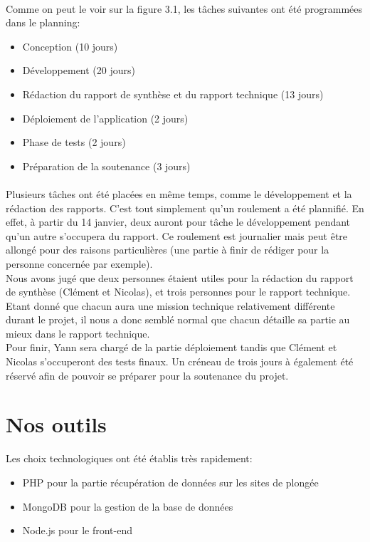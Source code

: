 \documentclass{report}
\begin{document}
\paragraph{}
Comme on peut le voir sur la figure 3.1, les tâches suivantes ont été programmées dans le planning:
\begin{itemize}
\item Conception (10 jours)
\item Développement (20 jours)
\item Rédaction du rapport de synthèse et du rapport technique (13 jours)
\item Déploiement de l'application (2 jours)
\item Phase de tests (2 jours)
\item Préparation de la soutenance (3 jours)
\end{itemize}


\paragraph{}
Plusieurs tâches ont été placées en même temps, comme le développement et la rédaction des rapports. C'est tout simplement qu'un roulement a été plannifié. En effet, à partir du 14 janvier, deux auront pour tâche le développement pendant qu'un autre s'occupera du rapport. Ce roulement est journalier mais peut être allongé pour des raisons particulières (une partie à finir de rédiger pour la personne concernée par exemple). \\

Nous avons jugé que deux personnes étaient utiles pour la rédaction du rapport de synthèse (Clément et Nicolas), et trois personnes pour le rapport technique. Etant donné que chacun aura une mission technique relativement différente durant le projet, il nous a donc semblé normal que chacun détaille sa partie au mieux dans le rapport technique.\\

Pour finir, Yann sera chargé de la partie déploiement tandis que Clément et Nicolas s'occuperont des tests finaux. Un créneau de trois jours à également été réservé afin de pouvoir se préparer pour la soutenance du projet.

\section{Nos outils}
Les choix technologiques ont été établis très rapidement: 
\begin{itemize}
\item PHP pour la partie récupération de données sur les sites de plongée
\item MongoDB pour la gestion de la base de données
\item Node.js pour le front-end
\end{itemize}
\end{document}
